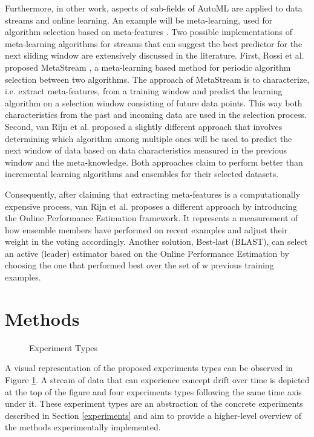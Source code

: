 \documentclass{sig-alternate-br}
\begin{document}
Furthermore, in other work, aspects of sub-fields of AutoML are applied to data streams and online learning. An example will be meta-learning, used for algorithm selection based on meta-features \cite{rossi2017guidance}. Two possible implementations of meta-learning algorithms for streams that can suggest the best predictor for the next sliding window are extensively discussed in the literature. First, Rossi et al. proposed MetaStream \cite{rossi2014metastream}, a meta-learning based method for periodic algorithm selection between two algorithms. The approach of MetaStream is to characterize, i.e. extract meta-features, from a training window and predict the learning algorithm on a selection window consisting of future data points. This way both characteristics from the past and incoming data are used in the selection process. Second, van Rijn et al. \cite{van2014algorithm} proposed a slightly different approach that involves determining which algorithm among multiple ones will be used to predict the next window of data based on data characteristics measured in the previous window and the meta-knowledge. Both approaches claim to perform better than incremental learning algorithms and ensembles for their selected datasets.

Consequently, after claiming that extracting meta-features is a computationally expensive process, van Rijn et al. \cite{van2018online} proposes a different approach by introducing the Online Performance Estimation framework. It represents a measurement of how ensemble members have performed on recent examples and adjust their weight in the voting accordingly. Another solution, Best-last (BLAST), can select an active (leader) estimator based on the Online Performance Estimation by choosing the one that performed best over the set of w previous training examples.

\section{Methods}
\label{methods}

\begin{figure}
\centering 
{}
\caption{Experiment Types}
\label{fig:experiments}
\end{figure}

A visual representation of the proposed experiments types can be observed in Figure \ref{fig:experiments}. A stream of data that can experience concept drift over time is depicted at the top of the figure and four experiments types following the same time axis under it. These experiment types are an abstraction of the concrete experiments described in Section \ref{experiments} and aim to provide a higher-level overview of the methods experimentally implemented.
\end{document}
